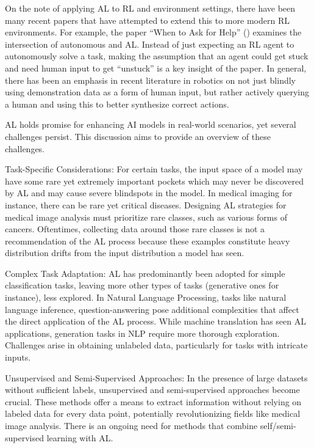 \documentclass[
  letterpaper,
  numbers=noenddot,
  DIV=11]{scrreprt}
\theoremstyle{plain}
\theoremstyle{definition}
\theoremstyle{remark}
\begin{document}
On the note of applying AL to RL and environment settings, there have
been many recent papers that have attempted to extend this to more
modern RL environments. For example, the paper ``When to Ask for Help''
() examines the intersection of
autonomous and AL. Instead of just expecting an RL agent to autonomously
solve a task, making the assumption that an agent could get stuck and
need human input to get ``unstuck'' is a key insight of the paper. In
general, there has been an emphasis in recent literature in robotics on
not just blindly using demonstration data as a form of human input, but
rather actively querying a human and using this to better synthesize
correct actions.

AL holds promise for enhancing AI models in real-world scenarios, yet
several challenges persist. This discussion aims to provide an overview
of these challenges.

Task-Specific Considerations: For certain tasks, the input space of a
model may have some rare yet extremely important pockets which may never
be discovered by AL and may cause severe blindspots in the model. In
medical imaging for instance, there can be rare yet critical diseases.
Designing AL strategies for medical image analysis must prioritize rare
classes, such as various forms of cancers. Oftentimes, collecting data
around those rare classes is not a recommendation of the AL process
because these examples constitute heavy distribution drifts from the
input distribution a model has seen.

Complex Task Adaptation: AL has predominantly been adopted for simple
classification tasks, leaving more other types of tasks (generative ones
for instance), less explored. In Natural Language Processing, tasks like
natural language inference, question-answering pose additional
complexities that affect the direct application of the AL process. While
machine translation has seen AL applications, generation tasks in NLP
require more thorough exploration. Challenges arise in obtaining
unlabeled data, particularly for tasks with intricate inputs.

Unsupervised and Semi-Supervised Approaches: In the presence of large
datasets without sufficient labels, unsupervised and semi-supervised
approaches become crucial. These methods offer a means to extract
information without relying on labeled data for every data point,
potentially revolutionizing fields like medical image analysis. There is
an ongoing need for methods that combine self/semi-supervised learning
with AL.
\end{document}
